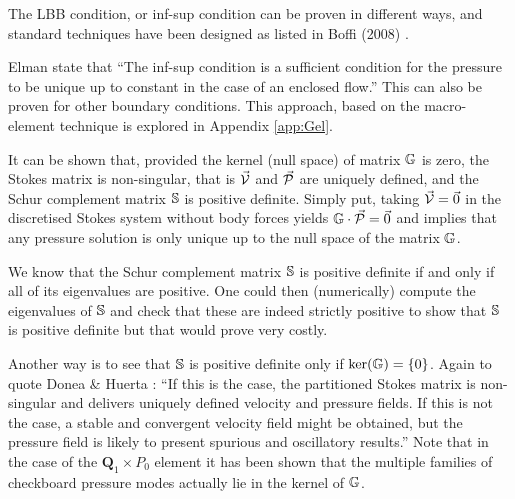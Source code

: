 The LBB condition, or inf-sup condition can be proven in different ways, 
and standard techniques have been designed
as listed in Boffi \etal (2008) \cite{bobf08}.

Elman \etal \cite{elsw} state that ``The inf-sup condition is a sufficient condition 
for the pressure to be unique up to constant in the case of an enclosed flow.''
This can also be proven for other boundary conditions.
This approach, based on the macro-element technique \cite{sten90} is explored in Appendix \ref{app:Gel}.

It can be shown that, provided the kernel (null space) of matrix ${\mathbb{G}}$ is zero,
the Stokes matrix is non-singular, that is $\vec{\cal V}$ and $\vec{\cal P}$ 
are uniquely defined, and the Schur complement matrix ${\mathbb{S}}$ is positive definite. 
Simply put, taking $\vec{\cal V}=\vec{0}$ in the discretised Stokes system 
without body forces yields ${\mathbb{G}} \cdot \vec{\cal P}=\vec{0}$ and implies
that any pressure solution is only unique up to the null space of the matrix ${\mathbb{G}}$.

We know that the Schur complement matrix ${\mathbb{S}}$ is positive definite if and only if all of its eigenvalues are positive.
One could then (numerically) compute the eigenvalues of ${\mathbb{S}}$ and check that these are indeed strictly positive
to show that ${\mathbb{S}}$ is positive definite but that would prove very costly. 

Another way is to see that ${\mathbb{S}}$ is positive definite only if $\text{ker}({\mathbb{G}})=\{0\}$.
Again to quote Donea \& Huerta \cite{dohu03}: ``If this is the case, the partitioned Stokes matrix  
is non-singular and delivers uniquely defined velocity and pressure fields. If this is not the case, a
stable and convergent velocity field might be obtained, but the pressure field is likely
to present spurious and oscillatory results.'' 
Note that in the case of the ${\bm Q}_1 \times P_0$ element it has been shown that the multiple families of 
checkboard pressure modes actually lie in the kernel of ${\mathbb{G}}$. \cite{sagl81a,sagl81b}

\hspace{.4cm}

